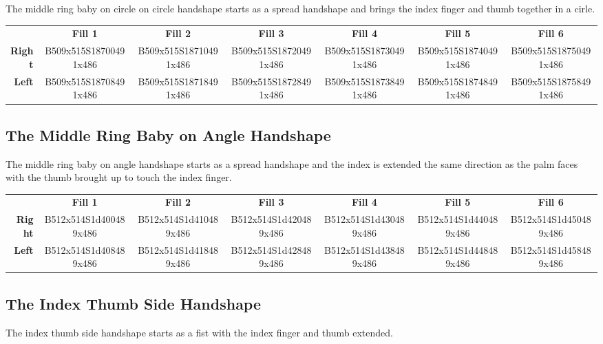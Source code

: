 \documentclass{article}
\begin{document}
The middle ring baby on circle on circle handshape starts as a spread handshape and brings the index finger and thumb together in a cirle.

\begin{center}
\begin{tabular}{r*{6}{c}}
&\textbf{Fill 1}&\textbf{Fill 2}&\textbf{Fill 3}&\textbf{Fill 4}&\textbf{Fill 5}&\textbf{Fill 6}\\
\textbf{Right}&
B509x515S18700491x486&
B509x515S18710491x486&
B509x515S18720491x486&
B509x515S18730491x486&
B509x515S18740491x486&
B509x515S18750491x486\\
\textbf{Left}&
B509x515S18708491x486&
B509x515S18718491x486&
B509x515S18728491x486&
B509x515S18738491x486&
B509x515S18748491x486&
B509x515S18758491x486\\
\end{tabular}
\end{center}

\subsection{The Middle Ring Baby on Angle Handshape}

The middle ring baby on angle handshape starts as a spread handshape and the index is extended the same direction as the palm faces with the thumb brought up to touch the index finger.

\begin{center}
\begin{tabular}{r*{6}{c}}
&\textbf{Fill 1}&\textbf{Fill 2}&\textbf{Fill 3}&\textbf{Fill 4}&\textbf{Fill 5}&\textbf{Fill 6}\\
\textbf{Right}&
B512x514S1d400489x486&
B512x514S1d410489x486&
B512x514S1d420489x486&
B512x514S1d430489x486&
B512x514S1d440489x486&
B512x514S1d450489x486\\
\textbf{Left}&
B512x514S1d408489x486&
B512x514S1d418489x486&
B512x514S1d428489x486&
B512x514S1d438489x486&
B512x514S1d448489x486&
B512x514S1d458489x486\\
\end{tabular}
\end{center}

\subsection{The Index Thumb Side Handshape}

The index thumb side handshape starts as a fist with the index finger and thumb extended.
\end{document}
